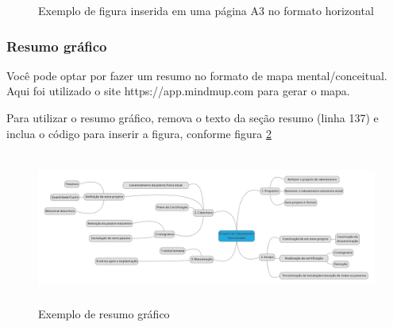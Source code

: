 \documentclass[	DIV=calc,%
							paper=a4,%
							fontsize=12pt,%
							onecolumn]{scrartcl}	 					%
\begin{document}
\clearpage
{}
\recalctypearea


\clearpage
{}
\recalctypearea

	
\begin{figure}
	\noindent{}
	\caption{Exemplo de figura inserida em uma página A3 no formato horizontal}
	\label{fig5}
\end{figure}

\clearpage
{}
\recalctypearea


\subsubsection{Resumo gráfico}

Você pode optar por fazer um resumo no formato de mapa mental/conceitual. 
Aqui foi utilizado o site https://app.mindmup.com para gerar o mapa.

Para utilizar o resumo gráfico, remova o texto da seção resumo (linha 137) e inclua o código para inserir a figura, conforme figura \ref{fig6}

\begin{figure}[h]
	\centering
	\includegraphics[width=\textwidth,height=5cm,keepaspectratio]{fig4}
	\caption{Exemplo de resumo gráfico}
	\label{fig6}	
\end{figure}

\end{document}
